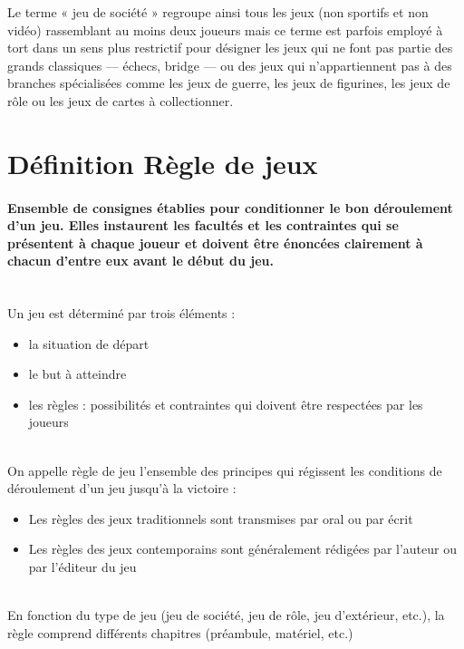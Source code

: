 Le terme « jeu de société » regroupe ainsi tous les jeux (non sportifs et non vidéo) rassemblant au moins deux joueurs mais ce terme est parfois employé à tort dans un sens plus restrictif pour désigner les jeux qui ne font pas partie des grands classiques — échecs, bridge — ou des jeux qui n’appartiennent pas à des branches spécialisées comme les jeux de guerre, les jeux de figurines, les jeux de rôle ou les jeux de cartes à collectionner. 

\newpage

\section{Définition Règle de jeux}

\paragraph{Ensemble de consignes établies pour conditionner le bon déroulement d'un jeu. Elles instaurent les facultés et les contraintes qui se présentent à chaque joueur et doivent être énoncées clairement à chacun d'entre eux avant le début du jeu.}~\\

Un jeu est déterminé par trois éléments :
	\begin{itemize}
		\item la situation de départ
		\item le but à atteindre
		\item les règles : possibilités et contraintes qui doivent être respectées par les joueurs
	\end{itemize}~\\

	On appelle règle de jeu l'ensemble des principes qui régissent les conditions de déroulement d'un jeu jusqu'à la victoire : \\
		\begin{itemize}
		\item Les règles des jeux traditionnels sont transmises par oral ou par écrit
		\item Les règles des jeux contemporains sont généralement rédigées par l'auteur ou par l'éditeur du jeu
	\end{itemize}~\\

	En fonction du type de jeu (jeu de société, jeu de rôle, jeu d'extérieur, etc.), la règle comprend différents chapitres (préambule, matériel, etc.)\\


 